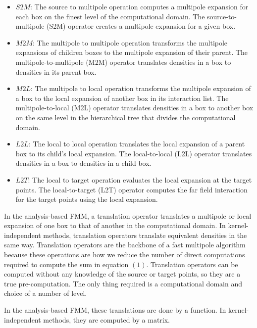 \documentclass[11pt, oneside]{article}   	%
\begin{document}
\begin{itemize}
\item $S2M$: The source to multipole operation computes a multipole expansion for each box on the finest level of the computational domain. The source-to-multipole (S2M) operator creates a multipole expansion for a given box.

\item $M2M$: The multipole to multipole operation transforms the multipole expansions of children boxes to the multipole expansion of their parent. The multipole-to-multipole (M2M) operator translates densities in a box to densities in its parent box.

\item $M2L$: The multipole to local operation transforms the multipole expansion of a box to the local expansion of another box in its interaction list. The multipole-to-local (M2L) operator translates densities in a box to another box on the same level in the hierarchical tree that divides the computational domain.

\item $L2L$: The local to local operation translates the local expansion of a parent box to its child's local expansion. The local-to-local (L2L) operator translates densities in a box to densities in a child box.

\item $L2T$: The local to target operation evaluates the local expansion at the target points. The local-to-target (L2T) operator computes the far field interaction for the target points using the local expansion.
\end{itemize}

In the analysis-based FMM, a translation operator translates a multipole or local expansion of one box to that of another in the computational domain. In kernel-independent methods, translation operators translate equivalent densities in the same way. Translation operators are the backbone of a fast multipole algorithm because these operations are how we reduce the number of direct computations required to compute the sum in equation $(1)$. Translation operators can be computed without any knowledge of the source or target points, so they are a true pre-computation. The only thing required is a computational domain and choice of a number of level.

In the analysis-based FMM, these translations are done by a function. In kernel-independent methods, they are computed by a matrix.
\end{document}
